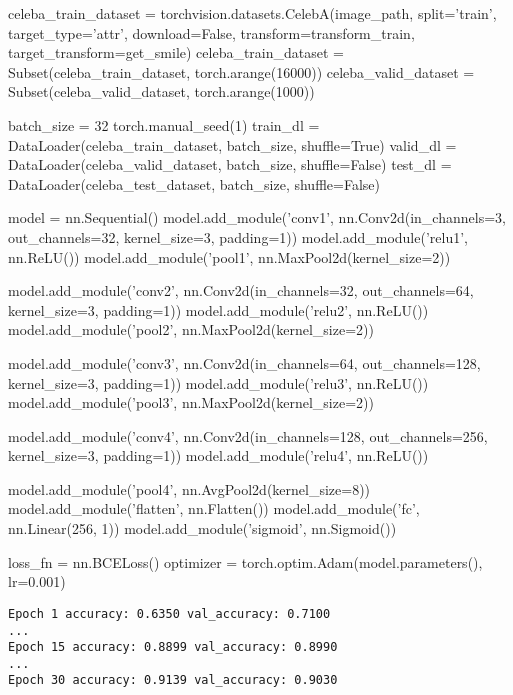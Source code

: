 \begin{pythoncode}
celeba_train_dataset = torchvision.datasets.CelebA(image_path, split='train', target_type='attr', download=False, transform=transform_train, target_transform=get_smile)
celeba_train_dataset = Subset(celeba_train_dataset, torch.arange(16000))
celeba_valid_dataset = Subset(celeba_valid_dataset, torch.arange(1000))
\end{pythoncode}

\begin{pythoncode}
batch_size = 32
torch.manual_seed(1)
train_dl = DataLoader(celeba_train_dataset, batch_size, shuffle=True)
valid_dl = DataLoader(celeba_valid_dataset, batch_size, shuffle=False)
test_dl = DataLoader(celeba_test_dataset, batch_size, shuffle=False)
\end{pythoncode}

\begin{pythoncode}
model = nn.Sequential()
model.add_module('conv1', nn.Conv2d(in_channels=3, out_channels=32, kernel_size=3, padding=1))
model.add_module('relu1', nn.ReLU())
model.add_module('pool1', nn.MaxPool2d(kernel_size=2))

model.add_module('conv2', nn.Conv2d(in_channels=32, out_channels=64, kernel_size=3, padding=1))
model.add_module('relu2', nn.ReLU())
model.add_module('pool2', nn.MaxPool2d(kernel_size=2))

model.add_module('conv3', nn.Conv2d(in_channels=64, out_channels=128, kernel_size=3, padding=1))
model.add_module('relu3', nn.ReLU())
model.add_module('pool3', nn.MaxPool2d(kernel_size=2))

model.add_module('conv4', nn.Conv2d(in_channels=128, out_channels=256, kernel_size=3, padding=1))
model.add_module('relu4', nn.ReLU())

model.add_module('pool4', nn.AvgPool2d(kernel_size=8))
model.add_module('flatten', nn.Flatten())
model.add_module('fc', nn.Linear(256, 1))
model.add_module('sigmoid', nn.Sigmoid())
\end{pythoncode}

\begin{pythoncode}
loss_fn = nn.BCELoss()
optimizer = torch.optim.Adam(model.parameters(), lr=0.001)
\end{pythoncode}

\begin{verbatim}
Epoch 1 accuracy: 0.6350 val_accuracy: 0.7100
...
Epoch 15 accuracy: 0.8899 val_accuracy: 0.8990
...
Epoch 30 accuracy: 0.9139 val_accuracy: 0.9030
\end{verbatim}